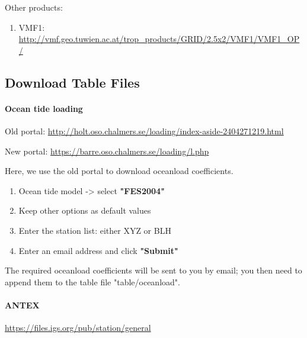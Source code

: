 Other products:
\begin{enumerate}
    \item VMF1: \url{http://vmf.geo.tuwien.ac.at/trop_products/GRID/2.5x2/VMF1/VMF1_OP/}
\end{enumerate}



\subsection{Download Table Files}
\label{app:table}

\paragraph{Ocean tide loading} \mbox{} \newline

Old portal: \url{http://holt.oso.chalmers.se/loading/index-aside-2404271219.html}

New portal: \url{https://barre.oso.chalmers.se/loading/l.php}

Here, we use the old portal to download oceanload coefficients.

\begin{enumerate}
    \item Ocean tide model -> select \textbf{"FES2004"}
    \item Keep other options as default values
    \item Enter the station list: either XYZ or BLH
    \item Enter an email address and click \textbf{"Submit"}
\end{enumerate}

The required oceanload coefficients will be sent to you by email;
you then need to append them to the table file "table/oceanload".


\paragraph{ANTEX} \mbox{} \newline
\url{https://files.igs.org/pub/station/general}



